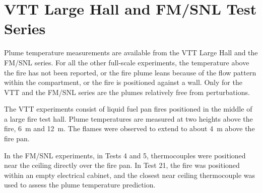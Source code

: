 \clearpage

\section{VTT Large Hall and FM/SNL Test Series}

\label{VTT_plume}

Plume temperature measurements are available from the VTT Large Hall and the FM/SNL series.
For all the other full-scale experiments, the temperature above the fire has not been reported, or the fire plume
leans because of the flow pattern within the compartment, or the fire is positioned against a wall.
Only for the VTT and the FM/SNL series are the plumes relatively free from perturbations.

The VTT experiments consist of liquid fuel pan fires positioned in the middle of a large fire test hall.
Plume temperatures are measured at two heights above the fire, 6~m and 12~m.
The flames were observed to extend to about 4~m above the fire pan.




In the FM/SNL experiments, in Tests 4 and 5, thermocouples were positioned near the ceiling directly over the fire pan.
In Test 21, the fire was positioned within an empty electrical cabinet, and the closest near ceiling thermocouple
was used to assess the plume temperature prediction.

